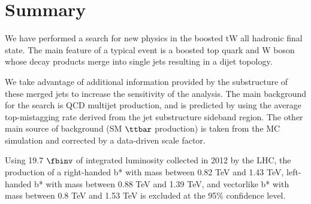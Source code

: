 \clearpage
\newpage
\section{Summary}
\label{sec:bssummary}
We have performed a search for new physics in the boosted tW all
hadronic final state.  The main feature of a typical event is a boosted top quark and W boson
whose decay products merge into single jets resulting in a dijet topology. 

We take advantage of additional information provided by the 
substructure of these merged jets  to increase the sensitivity of the analysis.  The main background for
the search is QCD multijet production, and is predicted by using the
average top-mistagging rate derived from the jet substructure sideband
region.  The other main source of background (SM $\ttbar$ production) is taken from 
the MC simulation and corrected by a data-driven scale factor.

Using 19.7$~\fbinv$ of integrated luminosity collected in 2012 by the
LHC, the production of a right-handed b* with mass between 0.82 TeV and 1.43 TeV, 
left-handed b* with mass between 0.88 TeV and 1.39 TeV, 
and vectorlike b* with mass between 0.8 TeV and 1.53 TeV is excluded at the 95\% confidence level.

